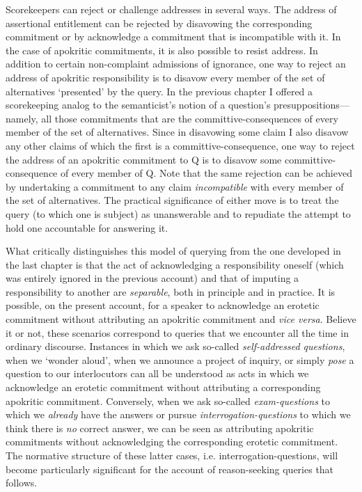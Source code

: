 \documentclass{article}                     %
\begin{document}
Scorekeepers can reject or challenge addresses in several ways. The
address of assertional entitlement can be rejected by disavowing the
corresponding commitment or by acknowledge a commitment that is incompatible
with it. In the case of apokritic commitments, it is also possible
to resist address. In addition to certain non-complaint admissions
of ignorance, one way to reject an address of apokritic responsibility
is to disavow every member of the set of alternatives `presented'
by the query. In the previous chapter I offered a scorekeeping analog
to the semanticist's notion of a question's presuppositions---namely,
all those commitments that are the committive-consequences of every
member of the set of alternatives. Since in disavowing some claim
I also disavow any other claims of which the first is a committive-consequence,
one way to reject the address of an apokritic commitment to Q is to
disavow some committive-consequence of every member of Q. Note that
the same rejection can be achieved by undertaking a commitment to
any claim \emph{incompatible} with every member of the set of alternatives.
The practical significance of either move is to treat the query (to
which one is subject) as unanswerable and to repudiate the attempt
to hold one accountable for answering it.

What critically distinguishes this model of querying from the one
developed in the last chapter is that the act of acknowledging a responsibility
oneself (which was entirely ignored in the previous account) and that
of imputing a responsibility to another are \emph{separable}, both
in principle and in practice. It is possible, on the present account,
for a speaker to acknowledge an erotetic commitment without attributing
an apokritic commitment and \emph{vice versa}. Believe it or not,
these scenarios correspond to queries that we encounter all the time
in ordinary discourse. Instances in which we ask so-called \emph{self-addressed
questions}, when we `wonder aloud', when we announce a project of
inquiry, or simply \emph{pose} a question to our interlocutors can
all be understood as acts in which we acknowledge an erotetic commitment
without attributing a corresponding apokritic commitment. Conversely,
when we ask so-called \emph{exam-questions} to which we \emph{already}
have the answers or pursue \emph{interrogation-questions} to which
we think there is \emph{no} correct answer, we can be seen as attributing
apokritic commitments without acknowledging the corresponding erotetic
commitment. The normative structure of these latter cases, i.e. interrogation-questions,
will become particularly significant for the account of reason-seeking
queries that follows. 
\end{document}

